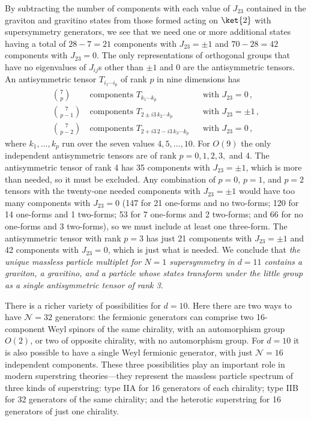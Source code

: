 By subtracting the number of components with each value of \(J_{23}\)
contained in the graviton and gravitino states from those formed acting
on \(\ket{2}\) with supersymmetry generators, we see that we need
one or more additional states having a total of \(28-7=21\) components
with \(J_{23}=\pm1\) and \(70-28=42\) components with \(J_{23}=0\).
The only representations of orthogonal groups that have no eigenvalues
of \(J_{ij}\)s other than \(\pm1\) and 0 are the antisymmetric tensors. An
antisymmetric tensor \(T_{i_1\cdots i_p}\) of rank \(p\) in nine
dimensions has
\[
  \begin{aligned}
    \binom{7}{p}
      &\ \text{components }T_{k_1\cdots k_p}
      &&\text{with }J_{23}=0\,,\\
    \binom{7}{p-1}
      &\ \text{components }T_{2\pm i3\,k_2\cdots k_p}
      &&\text{with }J_{23}=\pm1\,,\\
    \binom{7}{p-2}
      &\ \text{components }T_{2+i3\,2-i3\,k_3\cdots k_p}
      &&\text{with }J_{23}=0\,,
  \end{aligned}
\]
where \(k_1,\ldots,k_p\) run over the seven values \(4,5,\ldots,10\).
For \(O(9)\) the only independent antisymmetric tensors are of rank
\(p=0,1,2,3,\) and 4. The antisymmetric tensor of rank 4 has 35
components with \(J_{23}=\pm1\), which is more than needed, so it must be
excluded. Any combination of \(p=0\), \(p=1\), and \(p=2\) tensors with
the twenty-one needed components with \(J_{23}=\pm1\) would have too many
components with \(J_{23}=0\) (147 for 21 one-forms and no two-forms; 120
for 14 one-forms and 1 two-forms; 53 for 7 one-forms and 2 two-forms; and
66 for no one-forms and 3 two-forms), so we must include at least one
three-form. The antisymmetric tensor with rank \(p=3\) has just 21
components with \(J_{23}=\pm1\) and 42 components with \(J_{23}=0\),
which is just what is needed. We conclude that \emph{the unique massless
particle multiplet for \(N=1\) supersymmetry in \(d=11\) contains a
graviton, a gravitino, and a particle whose states transform under the
little group as a single antisymmetric tensor of rank 3}.

There is a richer variety of possibilities for \(d=10\). Here there are
two ways to have \(\mathcal N=32\) generators: the fermionic generators
can comprise two 16-component Weyl spinors of the same chirality, with an
automorphism group \(O(2)\), or two of opposite chirality, with no
automorphism group. For \(d=10\) it is also possible to have a single
Weyl fermionic generator, with just \(\mathcal N=16\) independent
components. These three possibilities play an important role in modern
superstring theories---they represent the massless particle spectrum of
three kinds of superstring: type IIA for 16 generators of each chirality;
type IIB for 32 generators of the same chirality; and the heterotic
superstring for 16 generators of just one chirality.

